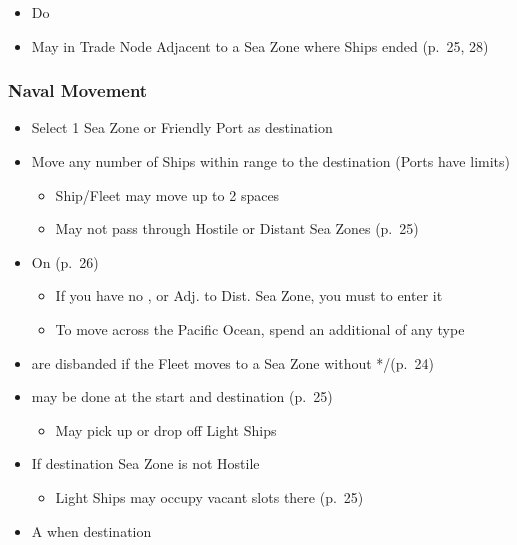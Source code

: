 \documentclass[10pt]{article}
\begin{document}
\begin{itemize}
	\item Do   
	\item May  in Trade Node Adjacent to a Sea Zone where Ships ended  (p.~25, 28)
\end{itemize}

\subsubsection*{Naval Movement}
\begin{itemize}
	\item Select 1 Sea Zone or Friendly Port as destination
	\item Move any number of Ships within range to the destination (Ports have limits)
	\begin{itemize}
		\item Ship/Fleet may move up to 2 spaces
		\item May not pass through Hostile or Distant Sea Zones (p.~25)
	\end{itemize}
	\item On  (p.~26)
	\begin{itemize}
		\item If you have no \claim, \town or \vassal Adj. to Dist. Sea Zone, you must  to enter it
		\item To move across the Pacific Ocean, spend an additional \monarchpower of any type
	\end{itemize}
	\item {} are disbanded if the Fleet moves to a Sea Zone without */\textdagger\xspace(p.~24)
	\item {} may be done at the start and destination (p.~25)
	\begin{itemize}
		\item May pick up or drop off Light Ships
	\end{itemize}
	\item If destination Sea Zone is not Hostile
	\begin{itemize}
		\item Light Ships may occupy vacant  slots there (p. 25)
	\end{itemize}
	\item A  when destination

\end{itemize}
\end{document}

